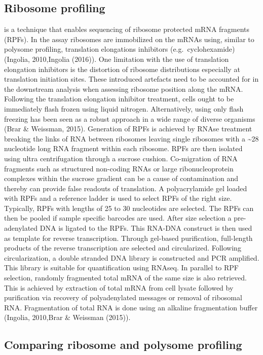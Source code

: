 \documentclass[12pt,openany]{book}
\begin{document}
\subsection{Ribosome profiling}

is a technique that enables sequencing of ribosome protected mRNA
fragments (RPFs). In the assay ribosomes are immobilized on the mRNAs
using, similar to polysome profiling, translation elongations inhibitors
(e.g.~cyclohexamide) (Ingolia, 2010,Ingolia (2016)). One limitation with
the use of translation elongation inhibitors is the distortion of
ribosome distributions especially at translation initiation sites. These
introduced artefacts need to be accounted for in the downstream analysis
when assessing ribosome position along the mRNA. Following the
translation elongation inhibitor treatment, cells ought to be
immediately flash frozen using liquid nitrogen. Alternatively, using
only flash freezing has been seen as a robust approach in a wide range
of diverse organisms (Brar \& Weissman, 2015). Generation of RPFs is
achieved by RNAse treatment breaking the links of RNA between ribosomes
leaving single ribosomes with a \textasciitilde{}28 nucleotide long RNA
fragment within each ribosome. RPFs are then isolated using ultra
centrifugation through a sucrose cushion. Co-migration of RNA fragments
such as structured non-coding RNAs or large ribonucleoprotein complexes
within the sucrose gradient can be a cause of contamination and thereby
can provide false readouts of translation. A polyacrylamide gel loaded
with RPFs and a reference ladder is used to select RPFs of the right
size. Typically, RPFs with lengths of 25 to 30 nucleotides are selected.
The RPFs can then be pooled if sample specific barcodes are used. After
size selection a pre-adenylated DNA is ligated to the RPFs. This RNA-DNA
construct is then used as template for reverse transcription. Through
gel-based purification, full-length products of the reverse
transcription are selected and circularized. Following circularization,
a double stranded DNA library is constructed and PCR amplified. This
library is suitable for quantification using RNAseq. In parallel to RPF
selection, randomly fragmented total mRNA of the same size is also
retrieved. This is achieved by extraction of total mRNA from cell lysate
followed by purification via recovery of polyadenylated messages or
removal of ribosomal RNA. Fragmentation of total RNA is done using an
alkaline fragmentation buffer (Ingolia, 2010,Brar \& Weissman (2015)).

\subsection{Comparing ribosome and polysome profiling}
\end{document}
